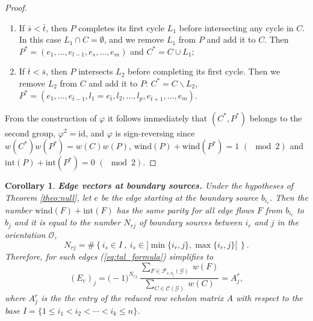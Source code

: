 \documentclass[11pt]{amsart}
\theoremstyle{plain}
\numberwithin{equation}{section}
\newtheorem{corollary}[theorem]{Corollary}
\begin{document}
\begin{proof}
\begin{enumerate}
\item  If $\bar s < \bar t$, then $P$ completes its first cycle $L_1$ before intersecting any cycle in $C$. In this case $L_1\cap C=\emptyset$, and we remove $L_1$ from $P$ and add it to $C$. Then $P^*=(e_1,\ldots,e_{l-1},e_s,\ldots,e_m)$ and $C^*=C\cup L_1$;
\item If $\bar t < \bar s$, then $P$ intersects  $L_2$ before completing its first cycle. Then we remove $L_2$ from $C$ and add it to $P$: $C^*=C\backslash L_2$, $P^*=(e_1,\ldots,e_{\bar t-1},l_1=e_{\bar t},l_2,\ldots,l_p,e_{\bar t+1},\ldots,e_m)$. 
\end{enumerate}
From the construction of $\varphi$ it follows immediately that $(C^*,P^*)$ belongs to the second group, $\varphi^2=\mbox{id}$, and $\varphi$ is sign-reversing since 
$w(C^*) w(P^*) = w(C) w(P)$, $\mbox{wind}(P) +\mbox{wind}(P^*) =1 \,\,
(\!\!\!\!\mod 2)$ and $\mbox{int}(P) +\mbox{int}(P^*) =0 \,\,
(\!\!\!\!\mod 2)$. 
\end{proof}

\begin{corollary}
\label{cor:bound_source}\textbf{Edge vectors at boundary sources.} Under the hypotheses of Theorem \ref{theo:null}, let $e$ be the edge starting at the boundary source $b_{i_r}$. Then the number $\mbox{wind}(F)+\mbox{int}(F)$ has the same parity for all edge flows $F$ from $b_{i_r}$ to $b_j$ and it is equal to the number $N_{rj}$ of boundary sources between $i_r$ and $j$ in the orientation $\mathcal O$,
\begin{equation}\label{eq:index_source}
N_{rj} = \# \left\{ i_s \in I\ , \ i_s \in \big] \min \{i_r, j\}, \max \{ i_r , j \} \big[ \ \right\}.
\end{equation}
Therefore, for such edges (\ref{eq:tal_formula}) simplifies to
\begin{equation}
\label{eq:tal_formula_source}
\left(E_{e}\right)_{j}= \big(-1\big)^{N_{rj}}\ \frac{\sum_{F\in {\mathcal F}_{e,b_j}(\mathcal G)} \ w(F)}{\sum_{C\in {\mathcal C}(\mathcal G)} \ w(C)} =A^r_{j},
\end{equation}
where $A^r_j$ is the the entry of the reduced row echelon matrix $A$ with respect to the base $I=\{1\le i_1 < i_2 < \cdots < i_k \le n\}$.
\end{corollary}
\end{document}
